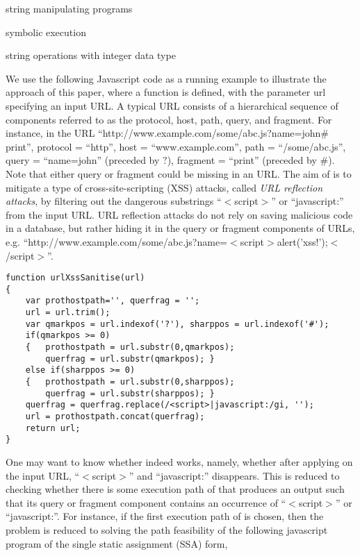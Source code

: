 
string manipulating programs

symbolic execution

string operations with integer data type

We use the following Javascript code as a running example to illustrate the approach of this paper, where a function {\urlxsssanitise} is defined, with the parameter url specifying an input URL. A typical URL consists of a hierarchical sequence of components referred to as the protocol, host, path, query, and fragment. For instance, in the URL ``http://www.example.com/some/abc.js?name=john$\#$print'', protocol = ``http'', host = ``www.example.com'', path = ``/some/abc.js'', query = ``name=john'' (preceded by $?$), fragment = ``print'' (preceded by $\#$). Note that either query or fragment could be missing in an URL. The aim of {\urlxsssanitise} is to mitigate a type of cross-site-scripting (XSS) attacks, called \emph{URL reflection attacks}, by filtering out the dangerous substrings ``$<$script$>$'' or ``javascript:'' from the input URL. URL reflection attacks  do not rely on saving malicious code in a database, but rather hiding it in the query or fragment components of URLs, e.g. ``http://www.example.com/some/abc.js?name=$<$script$>$alert('xss!');$<$/script$>$''.
{\small
\begin{verbatim}
function urlXssSanitise(url)
{
    var prothostpath='', querfrag = '';
    url = url.trim();
    var qmarkpos = url.indexof('?'), sharppos = url.indexof('#');
    if(qmarkpos >= 0) 
    {   prothostpath = url.substr(0,qmarkpos);
        querfrag = url.substr(qmarkpos); }
    else if(sharppos >= 0)
    {   prothostpath = url.substr(0,sharppos);
        querfrag = url.substr(sharppos); }
    querfrag = querfrag.replace(/<script>|javascript:/gi, '');
    url = prothostpath.concat(querfrag);
    return url;
}
\end{verbatim}
}


One may want to know whether {\urlxsssanitise} indeed works, namely, whether after applying {\urlxsssanitise} on the input URL, ``$<$script$>$'' and ``javascript:'' disappears.  This is reduced to checking whether there is some execution path of {\urlxsssanitise} that produces an output such that its query or fragment component contains an occurrence of ``$<$script$>$'' or ``javascript:''. For instance, if the first execution path of {\urlxsssanitise} is chosen, then the problem is reduced to solving the path feasibility of the following javascript program of the single static assignment (SSA) form,

